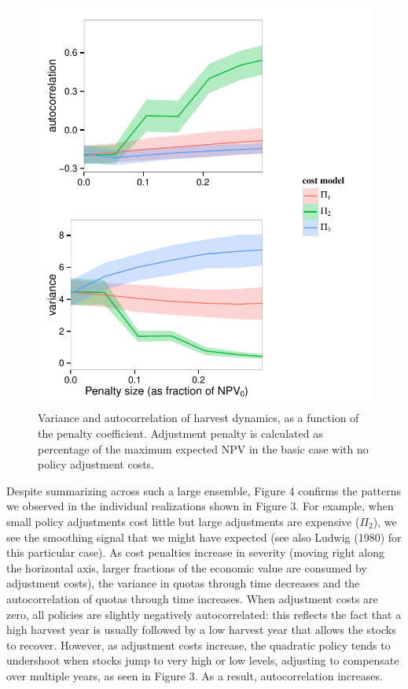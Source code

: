 \documentclass[review,12pt,author-year,titlepage]{components/elsarticle} %
\makeatletter
\def\maxwidth{\ifdim\Gin@nat@width>\linewidth\linewidth
\else\Gin@nat@width\fi}
\let\Oldincludegraphics\includegraphics
\renewcommand{\includegraphics}[1]{\Oldincludegraphics[width=\maxwidth]{#1}}
\makeatother
\begin{document}
\begin{flushleft}
\begin{figure}[htbp]
\centering
\includegraphics{components/figure/manuscript-Figure_4-1.pdf}
\caption{Variance and autocorrelation of harvest dynamics, as a function
of the penalty coefficient. Adjustment penalty is calculated as
percentage of the maximum expected NPV in the basic case with no policy
adjustment costs.}
\end{figure}

Despite summarizing across such a large ensemble, Figure 4 confirms the
patterns we observed in the individual realizations shown in Figure 3.
For example, when small policy adjustments cost little but large
adjustments are expensive (\(\Pi_2\)), we see the smoothing signal that
we might have expected (see also Ludwig (1980) for this particular
case). As cost penalties increase in severity (moving right along the
horizontal axis, larger fractions of the economic value are consumed by
adjustment costs), the variance in quotas through time decreases and the
autocorrelation of quotas through time increases. When adjustment costs
are zero, all policies are slightly negatively autocorrelated: this
reflects the fact that a high harvest year is usually followed by a low
harvest year that allows the stocks to recover. However, as adjustment
costs increase, the quadratic policy tends to undershoot when stocks
jump to very high or low levels, adjusting to compensate over multiple
years, as seen in Figure 3. As a result, autocorrelation increases.


\end{flushleft}
\end{document}
